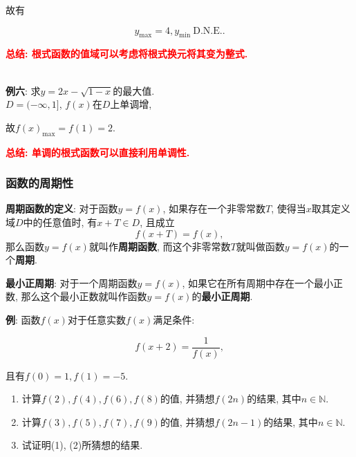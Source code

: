 \documentclass[8pt]{article}
\begin{document}
					故有

					$$y_{\max}=4, y_{\min} \mathrm{\ D.N.E.}.$$

					\textbf{\textcolor{red}{总结: 根式函数的值域可以考虑将根式换元将其变为整式.}}

				~\\

				\textbf{例六}: 求$y=2x-\sqrt{1-x}$的最大值.
					~\\

					$D=(-\infty, 1]$, $f(x)$在$D$上单调增,

					故$f(x)_{\max}=f(1)=2.$

					\textbf{\textcolor{red}{总结: 单调的根式函数可以直接利用单调性.}}

			\subsubsection{函数的周期性}

				\textbf{周期函数的定义}: 对于函数$y=f(x)$, 如果存在一个非零常数$T$, 使得当$x$取其定义域$D$中的任意值时, 有$x+T \in D$, 且成立$$f(x+T)=f(x),$$ 那么函数$y=f(x)$就叫作\textbf{周期函数}, 而这个非零常数$T$就叫做函数$y=f(x)$的一个\textbf{周期}.

				\textbf{最小正周期}: 对于一个周期函数$y=f(x)$, 如果它在所有周期中存在一个最小正数, 那么这个最小正数就叫作函数$y=f(x)$的\textbf{最小正周期}.


				\textbf{例}: 函数$f(x)$对于任意实数$f(x)$满足条件:

					$$f(x+2)=\frac{1}{f(x)},$$

					且有$f(0)=1, f(1)=-5.$

					\begin{enumerate}[label=(\arabic*)]
						\item 计算$f(2), f(4), f(6), f(8)$的值, 并猜想$f(2n)$的结果, 其中$n \in \mathbb{N}.$
						\item 计算$f(3), f(5), f(7), f(9)$的值, 并猜想$f(2n-1)$的结果, 其中$n \in \mathbb{N}.$
						\item 试证明(1), (2)所猜想的结果.
					\end{enumerate}
					~\\
\end{document}
